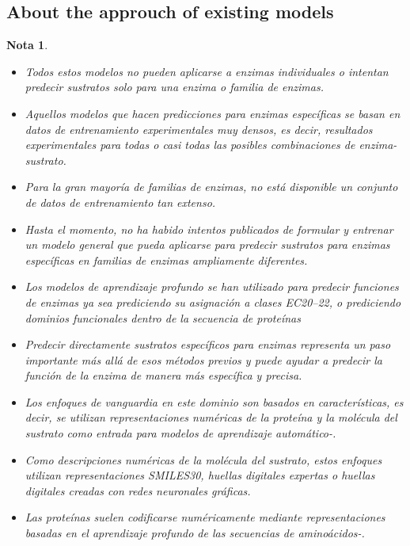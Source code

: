 \documentclass[12pt]{article}
\newtheorem{Note}{Nota}%
\begin{document}
\subsection{About the approuch of existing models}

\begin{Note}

\begin{itemize}
\item Todos estos modelos no pueden aplicarse a enzimas individuales o intentan predecir sustratos solo para una enzima o familia de enzimas. 

\item Aquellos modelos que hacen predicciones para enzimas específicas se basan en datos de entrenamiento experimentales muy densos, es decir, resultados experimentales para todas o casi todas las posibles combinaciones de enzima-sustrato.

\item Para la gran mayoría de familias de enzimas, no está disponible un conjunto de datos de entrenamiento tan extenso. 

\item Hasta el momento, no ha habido intentos publicados de formular y entrenar un modelo general que pueda aplicarse para predecir sustratos para enzimas específicas en familias de enzimas ampliamente diferentes. 

\item Los modelos de aprendizaje profundo se han utilizado para predecir funciones de enzimas ya sea prediciendo su asignación a clases EC20–22, o prediciendo dominios funcionales dentro de la secuencia de proteínas\cite{2.23}

\item Predecir directamente sustratos específicos para enzimas representa un paso importante más allá de esos métodos previos y puede ayudar a predecir la función de la enzima de manera más específica y precisa.

\item Los enfoques de vanguardia en este dominio son basados en características, es decir, se utilizan representaciones numéricas de la proteína y la molécula del sustrato como entrada para modelos de aprendizaje automático\cite{2.25}-\cite{2.29}. 

\item Como descripciones numéricas de la molécula del sustrato, estos enfoques utilizan representaciones SMILES30, huellas digitales expertas\cite{2.31} o huellas digitales creadas con redes neuronales gráficas\cite{2.32,2.33}. 

\item Las proteínas suelen codificarse numéricamente mediante representaciones basadas en el aprendizaje profundo de las secuencias de aminoácidos\cite{2.34}-\cite{2.36}.

\end{itemize}

\end{Note}
\end{document}
